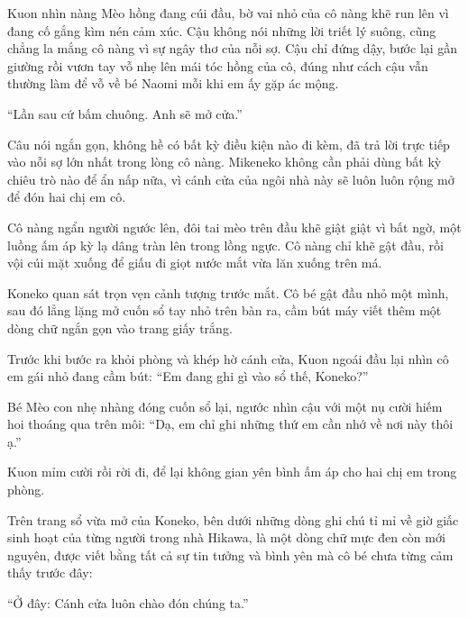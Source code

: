 ﻿\documentclass[../main.tex]{subfiles}
\begin{document}
Kuon nhìn nàng Mèo hồng đang cúi đầu, bờ vai nhỏ của cô nàng khẽ run lên vì đang cố gắng kìm nén cảm xúc. Cậu không nói những lời triết lý suông, cũng chẳng la mắng cô nàng vì sự ngây thơ của nỗi sợ. Cậu chỉ đứng dậy, bước lại gần giường rồi vươn tay vỗ nhẹ lên mái tóc hồng của cô, đúng như cách cậu vẫn thường làm để vỗ về bé Naomi mỗi khi em ấy gặp ác mộng.

``Lần sau cứ bấm chuông. Anh sẽ mở cửa.''

Câu nói ngắn gọn, không hề có bất kỳ điều kiện nào đi kèm, đã trả lời trực tiếp vào nỗi sợ lớn nhất trong lòng cô nàng. Mikeneko không cần phải dùng bất kỳ chiêu trò nào để ẩn nấp nữa, vì cánh cửa của ngôi nhà này sẽ luôn luôn rộng mở để đón hai chị em cô.

Cô nàng ngẩn người ngước lên, đôi tai mèo trên đầu khẽ giật giật vì bất ngờ, một luồng ấm áp kỳ lạ dâng tràn lên trong lồng ngực. Cô nàng chỉ khẽ gật đầu, rồi vội cúi mặt xuống để giấu đi giọt nước mắt vừa lăn xuống trên má.

Koneko quan sát trọn vẹn cảnh tượng trước mắt. Cô bé gật đầu nhỏ một mình, sau đó lẳng lặng mở cuốn sổ tay nhỏ trên bàn ra, cầm bút máy viết thêm một dòng chữ ngắn gọn vào trang giấy trắng.

Trước khi bước ra khỏi phòng và khép hờ cánh cửa, Kuon ngoái đầu lại nhìn cô em gái nhỏ đang cầm bút: ``Em đang ghi gì vào sổ thế, Koneko?''

Bé Mèo con nhẹ nhàng đóng cuốn sổ lại, ngước nhìn cậu với một nụ cười hiếm hoi thoáng qua trên môi: ``Dạ, em chỉ ghi những thứ em cần nhớ về nơi này thôi ạ.''

Kuon mỉm cười rồi rời đi, để lại không gian yên bình ấm áp cho hai chị em trong phòng.

Trên trang sổ vừa mở của Koneko, bên dưới những dòng ghi chú tỉ mỉ về giờ giấc sinh hoạt của từng người trong nhà Hikawa, là một dòng chữ mực đen còn mới nguyên, được viết bằng tất cả sự tin tưởng và bình yên mà cô bé chưa từng cảm thấy trước đây:

\begin{center}
    ``Ở đây: Cánh cửa luôn chào đón chúng ta.''
\end{center}
\end{document}
